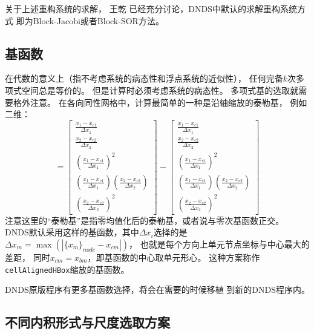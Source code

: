 \documentclass[UTF8,zihao=5]{ctexart} %
\newcommand*{\inc}[0]{{\Delta}}
\newcommand*{\mean}[1]{{#1}}
\begin{document}
关于上述重构系统的求解，
王乾
\cite{wang2016compact,wang2016compact2,wang2017compact3}
已经充分讨论，DNDS中默认的求解重构系统方式
即为Block-Jacobi或者Block-SOR方法。

\subsection{基函数}

在代数的意义上（指不考虑系统的病态性和浮点系统的近似性），
任何完备$k$次多项式空间总是等价的。
但是计算时必须考虑系统的病态性。
多项式基的选取就需要格外注意。
在各向同性网格中，计算最简单的一种是沿轴缩放的泰勒基，
例如二维：
\begin{equation}
    [\phi_i^l] = \begin{bmatrix}
        \frac{x_1-x_{c1}}{\inc x_1}                                \\
        \frac{x_2-x_{c2}}{\inc x_2}                                \\
        (\frac{x_1-x_{c1}}{\inc x_1})^2                            \\
        (\frac{x_1-x_{c1}}{\inc x_1})(\frac{x_2-x_{c2}}{\inc x_2}) \\
        (\frac{x_2-x_{c2}}{\inc x_2})^2
    \end{bmatrix}
    -\mean{
        \begin{bmatrix}
            \frac{x_1-x_{c1}}{\inc x_1}                                \\
            \frac{x_2-x_{c2}}{\inc x_2}                                \\
            (\frac{x_1-x_{c1}}{\inc x_1})^2                            \\
            (\frac{x_1-x_{c1}}{\inc x_1})(\frac{x_2-x_{c2}}{\inc x_2}) \\
            (\frac{x_2-x_{c2}}{\inc x_2})^2
        \end{bmatrix}}
\end{equation}
注意这里的“泰勒基”是指零均值化后的泰勒基，或者说与零次基函数正交。
DNDS默认采用这样的基函数，其中$\inc x_i$选择的是
$\inc x_m = \max(|\{x_m\}_{node}-x_{cm}|)$，
也就是每个方向上单元节点坐标与中心最大的差距，
同时$x_{cm}=x_{bm}$，即基函数的中心取单元形心。
这种方案称作\verb|cellAlignedHBox|缩放的基函数。

DNDS原版程序有更多基函数选择，将会在需要的时候移植
到新的DNDS程序内。

\subsection{不同内积形式与尺度选取方案}
\end{document}
